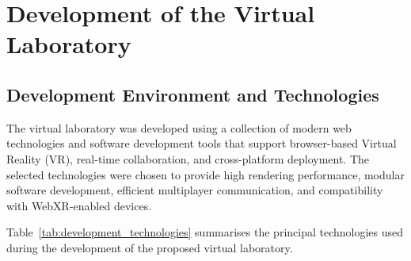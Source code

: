 \chapter{Development of the Virtual Laboratory}

\section{Development Environment and Technologies}

The virtual laboratory was developed using a collection of modern web technologies and software development tools that support browser-based Virtual Reality (VR), real-time collaboration, and cross-platform deployment. The selected technologies were chosen to provide high rendering performance, modular software development, efficient multiplayer communication, and compatibility with WebXR-enabled devices.

Table~\ref{tab:development_technologies} summarises the principal technologies used during the development of the proposed virtual laboratory.

